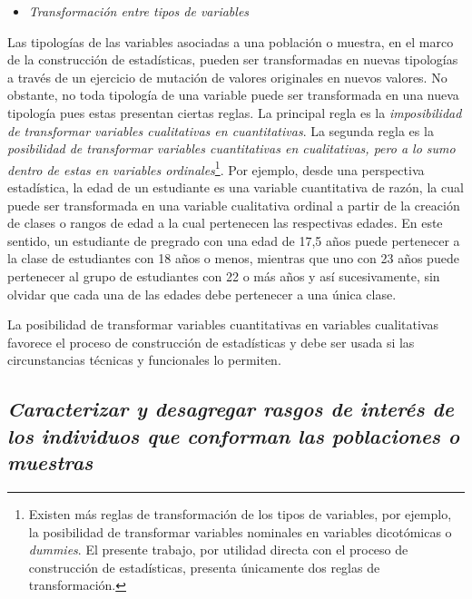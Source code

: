 \documentclass[
]{book}
\providecommand{\tightlist}{%
  \setlength{\itemsep}{0pt}\setlength{\parskip}{0pt}}
\begin{document}
\begin{itemize}
\tightlist
\item
  \emph{Transformación entre tipos de variables}
\end{itemize}

Las tipologías de las variables asociadas a una población o muestra, en el marco de la construcción de estadísticas, pueden ser transformadas en nuevas tipologías a través de un ejercicio de mutación de valores originales en nuevos valores. No obstante, no toda tipología de una variable puede ser transformada en una nueva tipología pues estas presentan ciertas reglas. La principal regla es la \emph{imposibilidad de transformar variables cualitativas en cuantitativas}. La segunda regla es la \emph{posibilidad de transformar variables cuantitativas en cualitativas, pero a lo sumo dentro de estas en variables ordinales}\footnote{Existen más reglas de transformación de los tipos de variables, por ejemplo, la posibilidad de transformar variables nominales en variables dicotómicas o \emph{dummies}. El presente trabajo, por utilidad directa con el proceso de construcción de estadísticas, presenta únicamente dos reglas de transformación.}. Por ejemplo, desde una perspectiva estadística, la edad de un estudiante es una variable cuantitativa de razón, la cual puede ser transformada en una variable cualitativa ordinal a partir de la creación de clases o rangos de edad a la cual pertenecen las respectivas edades. En este sentido, un estudiante de pregrado con una edad de 17,5 años puede pertenecer a la clase de estudiantes con 18 años o menos, mientras que uno con 23 años puede pertenecer al grupo de estudiantes con 22 o más años y así sucesivamente, sin olvidar que cada una de las edades debe pertenecer a una única clase.

La posibilidad de transformar variables cuantitativas en variables cualitativas favorece el proceso de construcción de estadísticas y debe ser usada si las circunstancias técnicas y funcionales lo permiten.

\hypertarget{caracterizar-y-desagregar-rasgos-de-interuxe9s-de-los-individuos-que-conforman-las-poblaciones-o-muestras}{%
\subsection{\texorpdfstring{\textbf{\emph{Caracterizar y desagregar rasgos de interés de los individuos que conforman las poblaciones o muestras}}}{Caracterizar y desagregar rasgos de interés de los individuos que conforman las poblaciones o muestras}}\label{caracterizar-y-desagregar-rasgos-de-interuxe9s-de-los-individuos-que-conforman-las-poblaciones-o-muestras}}
\end{document}
